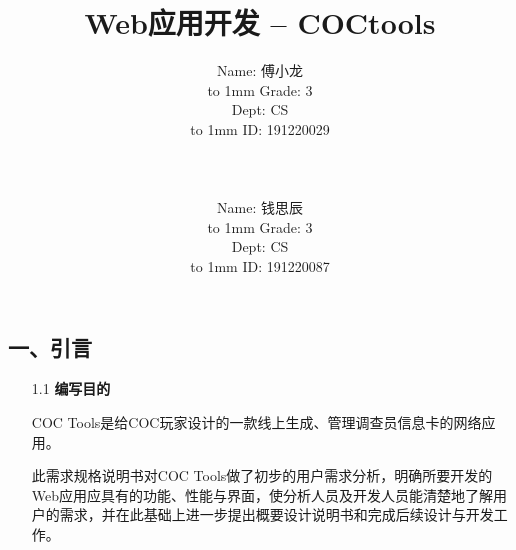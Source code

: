 \documentclass[a4paper,UTF8]{article}
\theoremstyle{definition}
\begin{document}
\begin{CJK}{UTF8}{gkai}
\title{Web应用开发 -- COCtools}
\author{
    \begin{minipage}[b]{0.3\linewidth}
      \begin{flushright}
        Name: 傅小龙\\%
        \vbox to 1mm{}
        Grade: 3%
      \end{flushright}
    \end{minipage}
    \hfill
    \begin{minipage}[b]{0.3\linewidth}
      \begin{flushright}
        Dept: CS\\%
        \vbox to 1mm{}
        ID: 191220029%
      \end{flushright}
    \end{minipage}\\\\
    \begin{minipage}[b]{0.3\linewidth}
      \begin{flushright}
        Name: 钱思辰\\%
        \vbox to 1mm{}
        Grade: 3%
      \end{flushright}
    \end{minipage}
    \hfill
    \begin{minipage}[b]{0.3\linewidth}
      \begin{flushright}
        Dept: CS\\%
        \vbox to 1mm{}
        ID: 191220087%
      \end{flushright}
    \end{minipage}
}
\date{}
\maketitle

\setlength{\baselineskip}{18pt}
\begin{flushleft}
\begin{CJK*}{UTF8}{gbsn}
\section*{一、引言}
\end{CJK*}
\end{flushleft}
\begin{enumerate}
	\item[1.1] \textbf{编写目的}
	\par COC Tools是给COC玩家设计的一款线上生成、管理调查员信息卡的网络应用。
	\par 此需求规格说明书对COC Tools做了初步的用户需求分析，明确所要开发的Web应用应具有的功能、性能与界面，使分析人员及开发人员能清楚地了解用户的需求，并在此基础上进一步提出概要设计说明书和完成后续设计与开发工作。
\end{enumerate}


\end{CJK}
\end{document}
